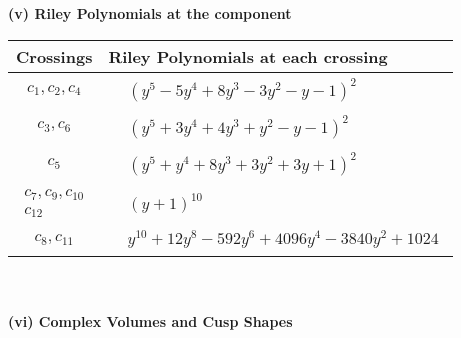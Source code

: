 \documentclass[1p]{elsarticle_modified}
\theoremstyle{definition}
\begin{document}
\newpage\renewcommand{\arraystretch}{1}
\flushleft \textbf{(v) Riley Polynomials at the component}\newline \\
\begin{tabular}{m{50pt}|m{274pt}}
Crossings & \hspace{64pt}Riley Polynomials at each crossing \\
\hline $$\begin{aligned}c_{1},c_{2},c_{4}\end{aligned}$$&$\begin{aligned}
&(y^5-5 y^4+8 y^3-3 y^2- y-1)^2
\end{aligned}$\\
\hline $$\begin{aligned}c_{3},c_{6}\end{aligned}$$&$\begin{aligned}
&(y^5+3 y^4+4 y^3+y^2- y-1)^2
\end{aligned}$\\
\hline $$\begin{aligned}c_{5}\end{aligned}$$&$\begin{aligned}
&(y^5+y^4+8 y^3+3 y^2+3 y+1)^2
\end{aligned}$\\
\hline $$\begin{aligned}c_{7},c_{9},c_{10}\\c_{12}\end{aligned}$$&$\begin{aligned}
&(y+1)^{10}
\end{aligned}$\\
\hline $$\begin{aligned}c_{8},c_{11}\end{aligned}$$&$\begin{aligned}
&y^{10}+12 y^8-592 y^6+4096 y^4-3840 y^2+1024
\end{aligned}$\\
\hline
\end{tabular}\\~\\
\newpage\flushleft \textbf{(vi) Complex Volumes and Cusp Shapes}
\end{document}
